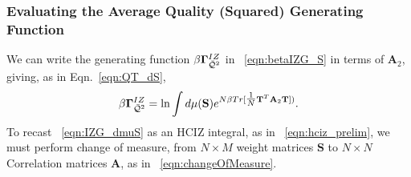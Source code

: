 %




\subsubsection{Evaluating the Average Quality (Squared) Generating Function }
\label{sxn:matgen_quality_hciz_B}

We can write the generating function $\beta\mathbf{\Gamma}^{IZ}_{\bar{\mathcal{Q}}^{2}}$ 
in \EQN~\ref{eqn:betaIZG_S} 
in terms of $\mathbf{A}_{2}$, giving, as in Eqn.~\ref{eqn:QT_dS}, 
\begin{align}
  \label{eqn:IZG_dmuS}
  \beta\mathbf{\Gamma}^{IZ}_{\bar{\mathcal{Q}}^{2}} = \ln \int d\mu({\mathbf{S}})  e^{ N\beta Tr[\tfrac{1}{N}{\mathbf{T}}^T\mathbf{A}_{2}{\mathbf{T}}]) }  .
\end{align}
To recast \EQN~\ref{eqn:IZG_dmuS} as an HCIZ integral, as in \EQN~\ref{eqn:hciz_prelim},
we must perform change of measure,
 from $N\times M$ \Student weight matrices $\mathbf{S}$ to $N\times N$ \Student Correlation matrices $\mathbf{A}$, as in \EQN~\ref{eqn:changeOfMeasure}.

